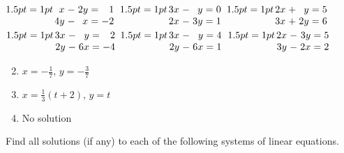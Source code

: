 \begin{multicols}{2}
\begin{ex}
\begin{exenumerate}
\exitem
$\arraycolsep=1pt
\begin{array}[t]{rlrcr}
	 x & - & 2y & = & 1 \\
	4y & - &  x & = & -2
\end{array}$
\exitem 
$\arraycolsep=1pt
\begin{array}[t]{rlrlrcr}
	3x & - & y  & = & 0 \\
	2x & - & 3y & = & 1
\end{array}$
\exitem 
$\arraycolsep=1pt
\begin{array}[t]{rlrlrcr}
	2x & + & y  & = & 5 \\
	3x & + & 2y & = & 6
\end{array}$
\exitem
$\arraycolsep=1pt
\begin{array}[t]{rlrlrcr}
	3x & - &  y & = & 2\\
	2y & - & 6x & = & -4
\end{array}$
\exitem
$\arraycolsep=1pt
\begin{array}[t]{rlrlrcr}
	3x & - &  y & = & 4 \\
	2y & - & 6x & = & 1
\end{array}$
\exitem
$\arraycolsep=1pt
\begin{array}[t]{rlrlrcr}
	2x & - & 3y & = & 5 \\
	3y & - & 2x & = & 2
\end{array}$
\end{exenumerate}
\begin{sol}
\begin{enumerate}[label={\alph*.}]
\setcounter{enumi}{1}
\item  $x = -\frac{1}{7}$, $y = - \frac{3}{7}$ 
\setcounter{enumi}{3}
\item  $x = \frac{1}{3}(t + 2)$, $y = t$
\setcounter{enumi}{5}
\item  No solution
\end{enumerate}
\end{sol}
\end{ex}

\begin{ex}
Find all solutions (if any) to each of the following systems of linear equations.


\end{ex}
\end{multicols}
